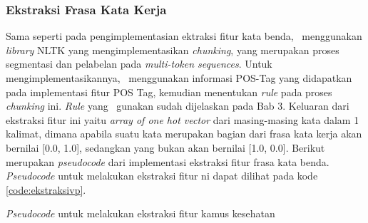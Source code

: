\subsubsection{Ekstraksi Frasa Kata Kerja}
Sama seperti pada pengimplementasian ektraksi fitur kata benda, \saya~menggunakan \textit{library} NLTK yang mengimplementasikan \textit{chunking}, yang merupakan proses segmentasi dan pelabelan pada \textit{multi-token sequences}. Untuk mengimplementasikannya, \saya~menggunakan informasi POS-Tag yang didapatkan pada implementasi fitur POS Tag, kemudian menentukan \textit{rule} pada proses \textit{chunking} ini. \textit{Rule} yang \saya~gunakan sudah dijelaskan pada Bab 3. Keluaran dari ekstraksi fitur ini yaitu \textit{array of one hot vector} dari masing-masing kata dalam 1 kalimat, dimana apabila suatu kata merupakan bagian dari frasa kata kerja akan bernilai [0.0, 1.0], sedangkan yang bukan akan bernilai [1.0, 0.0]. Berikut merupakan \textit{pseudocode} dari implementasi ekstraksi fitur frasa kata benda. \textit{Pseudocode} untuk melakukan ekstraksi fitur ni dapat dilihat pada kode \ref{code:ekstraksivp}.

\begin{kode}

	
	\SetAlgoLined
	\BlankLine
	
	\BlankLine	
	\caption{\textit{Pseudocode} untuk melakukan ekstraksi fitur kamus kesehatan}
	\label{code:ekstraksivp}
\end{kode}


